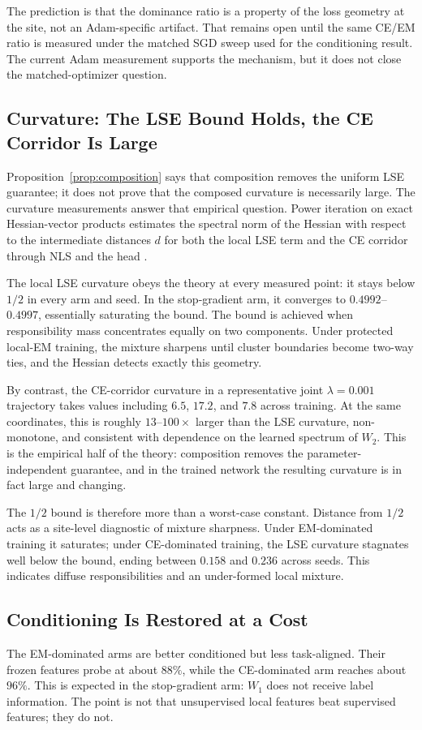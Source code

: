 The prediction is that the dominance ratio is a property of the loss geometry
at the site, not an Adam-specific artifact. That remains open until the same
CE/EM ratio is measured under the matched SGD sweep used for the conditioning
result. The current Adam measurement supports the mechanism, but it does not
close the matched-optimizer question.

\subsection{Curvature: The LSE Bound Holds, the CE Corridor Is Large}
Proposition~\ref{prop:composition} says that composition removes the uniform
LSE guarantee; it does not prove that the composed curvature is necessarily
large. The curvature measurements answer that empirical question. Power
iteration on exact Hessian-vector products estimates the spectral norm of the
Hessian with respect to the intermediate distances $d$ for both the local LSE
term and the CE corridor through NLS and the head \citep{pearlmutter1994fast}.

The local LSE curvature obeys the theory at every measured point: it stays
below $1/2$ in every arm and seed. In the stop-gradient arm, it converges to
$0.4992$--$0.4997$, essentially saturating the bound. The bound is achieved
when responsibility mass concentrates equally on two components. Under
protected local-EM training, the mixture sharpens until cluster boundaries
become two-way ties, and the Hessian detects exactly this geometry.

By contrast, the CE-corridor curvature in a representative joint
$\lambda=0.001$ trajectory takes values including $6.5$, $17.2$, and $7.8$
across training. At the same coordinates, this is roughly $13$--$100\times$
larger than the LSE curvature, non-monotone, and consistent with dependence on
the learned spectrum of $W_2$. This is the empirical half of the theory:
composition removes the parameter-independent guarantee, and in the trained
network the resulting curvature is in fact large and changing.

The $1/2$ bound is therefore more than a worst-case constant. Distance from
$1/2$ acts as a site-level diagnostic of mixture sharpness. Under EM-dominated
training it saturates; under CE-dominated training, the LSE curvature
stagnates well below the bound, ending between $0.158$ and $0.236$ across
seeds. This indicates diffuse responsibilities and an under-formed local
mixture.

\subsection{Conditioning Is Restored at a Cost}
The EM-dominated arms are better conditioned but less task-aligned. Their
frozen features probe at about $88\%$, while the CE-dominated arm reaches
about $96\%$. This is expected in the stop-gradient arm: $W_1$ does not
receive label information. The point is not that unsupervised local features
beat supervised features; they do not.

